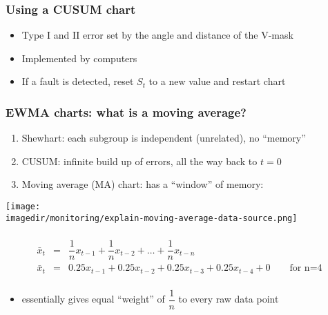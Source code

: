 \begin{frame}\frametitle{Using a CUSUM chart}
	\begin{itemize}
		\item	Type I and II error set by the angle and distance of the V-mask
		\item	Implemented by computers
		\item	If a fault is detected, reset $S_t$ to a new value and restart chart
	\end{itemize}
\end{frame}

\begin{frame}\frametitle{EWMA charts: what is a moving average?}
	\begin{enumerate}
		\item	Shewhart: each subgroup is independent (unrelated), no ``memory''
		\item	CUSUM: infinite build up of errors, all the way back to $t=0$
		\item	Moving average (MA) chart: has a ``window'' of memory:
	\end{enumerate}
	
	\begin{center}
		\texttt{[image: \\imagedir/monitoring/explain-moving-average-data-source.png]}
	\end{center}	
	$$
	\begin{array}{rcl}
		\\
		\bar{x}_t &=& \dfrac{1}{n}x_{t-1} + \dfrac{1}{n}x_{t-2} + \ldots + \dfrac{1}{n}x_{t-n} \\
		\bar{x}_t &=& 0.25x_{t-1} + 0.25x_{t-2} + 0.25x_{t-3} + 0.25x_{t-4} + 0\qquad \text{for n=4}\\
	\end{array}
	$$
	\begin{itemize}
		\item	essentially gives equal ``weight'' of $\dfrac{1}{n}$ to every raw data point
	\end{itemize}
\end{frame}

